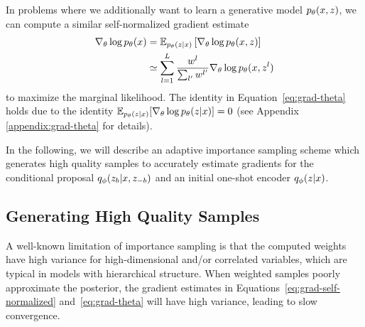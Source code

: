 \documentclass{article}
\theoremstyle{definition}
\begin{document}
In problems where we additionally want to learn a generative model $p_\theta(x, z)$, we can compute a similar self-normalized gradient estimate 
\begin{align}
    \nabla_\theta \log p_\theta(x) 
    &=
    \mathbb{E}_{p_\theta(z | x)} 
    \left[
    \nabla_\theta \log p_\theta(x, z)
    \right] \label{eq:grad-theta}\\
    &
    \simeq
    \sum_{l=1}^L
    \frac{w^l}{\sum_{l'} w^{l'}}
    \nabla_\theta
    \log p_\theta(x, z^l)
    \nonumber
\end{align}
to maximize the marginal likelihood.
The identity in Equation~\ref{eq:grad-theta} holds due to the identity \mbox{$\mathbb{E}_{p_\theta(z|x)}[\nabla_\theta \log p_\theta(z|x)]=0$} (see Appendix \ref{appendix:grad-theta} for details). 

In the following, we will describe an adaptive importance sampling scheme which generates high quality samples to accurately estimate gradients for the conditional proposal $q_\phi(z_b | x, z_{-b})$ and an initial one-shot encoder $q_\phi(z | x)$.

\subsection{Generating High Quality Samples}
A well-known limitation of importance sampling is that the computed weights have high variance for high-dimensional and/or correlated variables, which are typical in models with hierarchical structure. When weighted samples poorly approximate the posterior, the gradient estimates in Equations~\ref{eq:grad-self-normalized} and~\ref{eq:grad-theta} will have high variance, leading to slow convergence.

\end{document}
